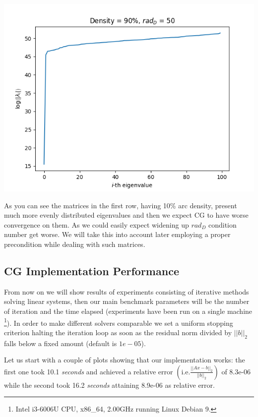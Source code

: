 \documentclass[12pt]{article}
\newcommand{\1}{\mathbbm{1}}
\begin{document}
{\includegraphics[scale=0.5, H]{eigen-100-90-50.png}

As you can see the matrices in the first row, having 10\% arc density, present much more evenly distributed eigenvalues and then we expect CG to have worse convergence on them. As we could easily expect widening up $rad_D$ condition number get worse. We will take this into account later employing a proper precondition while dealing with such matrices.  

\subsection{CG Implementation Performance}
From now on we will show results of experiments consisting of iterative methods solving linear systems, then our main benchmark parameters will be the number of iteration and the time elapsed (experiments have been run on a single machine
\footnote{Intel i3-6006U CPU, x86\_64, 2.00GHz running Linux Debian 9.}). In order to make different solvers comparable we set a uniform stopping criterion halting the iteration loop as soon as the residual norm divided by $||b||_2$ falls below a fixed amount (default is $1e-05$).

Let us start with a couple of plots showing that our implementation works: the first one took 10.1 \textit{seconds} and achieved a relative error $\left(\text{i.e.} \frac{||Ax - b||_2}{||b||_2}\right)$ of 8.3e-06 while the second took 16.2 \textit{seconds} attaining 8.9e-06 as relative error. 

}
\end{document}
